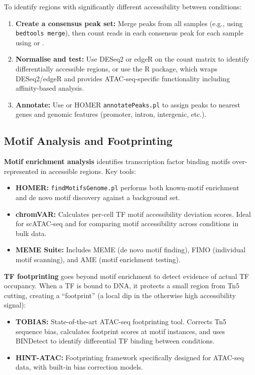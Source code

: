 To identify regions with significantly different accessibility between conditions:

\begin{enumerate}[itemsep=2pt]
  \item \textbf{Create a consensus peak set:} Merge peaks from all samples (e.g., using \texttt{bedtools merge}), then count reads in each consensus peak for each sample using  or .
  \item \textbf{Normalise and test:} Use DESeq2 or edgeR on the count matrix to identify differentially accessible regions, or use the  R package, which wraps DESeq2/edgeR and provides ATAC-seq-specific functionality including affinity-based analysis.
  \item \textbf{Annotate:} Use  or HOMER \texttt{annotatePeaks.pl} to assign peaks to nearest genes and genomic features (promoter, intron, intergenic, etc.).
\end{enumerate}

\subsection{Motif Analysis and Footprinting}
\label{subsec:chromatin:motifs}

\textbf{Motif enrichment analysis} identifies transcription factor binding motifs over-represented in accessible regions. Key tools:

\begin{itemize}[itemsep=2pt]
  \item \textbf{HOMER:} \texttt{findMotifsGenome.pl} performs both known-motif enrichment and de novo motif discovery against a background set.
  \item \textbf{chromVAR:} Calculates per-cell TF motif accessibility deviation scores. Ideal for scATAC-seq and for comparing motif accessibility across conditions in bulk data.
  \item \textbf{MEME Suite:} Includes MEME (de novo motif finding), FIMO (individual motif scanning), and AME (motif enrichment testing).
\end{itemize}

\textbf{TF footprinting} goes beyond motif enrichment to detect evidence of actual TF occupancy. When a TF is bound to DNA, it protects a small region from Tn5 cutting, creating a ``footprint'' (a local dip in the otherwise high accessibility signal):

\begin{itemize}[itemsep=2pt]
  \item \textbf{TOBIAS:} State-of-the-art ATAC-seq footprinting tool. Corrects Tn5 sequence bias, calculates footprint scores at motif instances, and uses BINDetect to identify differential TF binding between conditions.
  \item \textbf{HINT-ATAC:} Footprinting framework specifically designed for ATAC-seq data, with built-in bias correction models.
\end{itemize}

